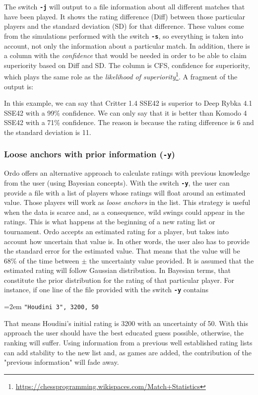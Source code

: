 \documentclass[12pt]{article}
\newcommand{\swtch} [1] {\texttt{\textbf{#1}}}
\newcommand{\cmdln}[1]{
	\par
	\begingroup
		\leftskip=2em
		\addtolength{\rightskip}{0em}
		\noindent \small{\texttt{#1}}
		\par
	\endgroup
}
\newcommand{\inctxt}[1]{
	\begingroup
    \fontsize{9pt}{11pt}\selectfont
		 
	\endgroup
}
\begin{document}
The switch \swtch{-j} will output to a file information about all different matches that have been played.
It shows the rating difference (Diff) between those particular players and the standard deviation (SD) for that difference.
These values come from the simulations performed with the switch \swtch{-s}, so everything is taken into account, not only the information about a particular match.
In addition, there is a column with the \textit{confidence} that would be needed in order to be able to claim superiority based on Diff and SD. 
The column is CFS, confidence for superiority, which plays the same role as the \textit{likelihood of superiority}\footnote{\url{https://chessprogramming.wikispaces.com/Match+Statistics}}.
A fragment of the output is:

\inctxt{readme-example-j-switch.txt}
In this example, we can say that Critter 1.4 SSE42 is superior to Deep Rybka 4.1 SSE42 with a 99\% confidence. We can only say that it is better than Komodo 4 SSE42 with a 71\% confidence. The reason is because the rating difference is 6 and the standard deviation is 11.


\subsubsection*{Loose anchors with prior information (\swtch{-y})}

Ordo offers an alternative approach to calculate ratings with previous knowledge from the user (using Bayesian concepts). 
With the switch \swtch{-y}, the user can provide a file with a list of players whose ratings will float around an estimated value.
Those players will work as \textit{loose anchors} in the list.
This strategy is useful when the data is scarce and, as a consequence, wild swings could appear in the ratings.
This is what happens at the beginning of a new rating list or tournament. 
Ordo accepts an estimated rating for a player, but takes into account how uncertain that value is.
In other words, the user also has to provide the standard error for the estimated value. 
That means that the value will be 68\% of the time between $\pm$ the uncertainty value provided.
It is assumed that the estimated rating will follow Gaussian distribution. 
In Bayesian terms, that constitute the prior distribution for the rating of that particular player.
For instance, if one line of the file provided with the switch \swtch{-y} contains


\cmdln{"Houdini 3",  3200,  50}

That means Houdini's initial rating is 3200 with an uncertainty of 50. 
With this approach the user should have the best educated guess possible, otherwise, the ranking will suffer. 
Using information from a previous well established rating lists can add stability to the new list and, as games are added, the contribution of the "previous information" will fade away.
\end{document}
